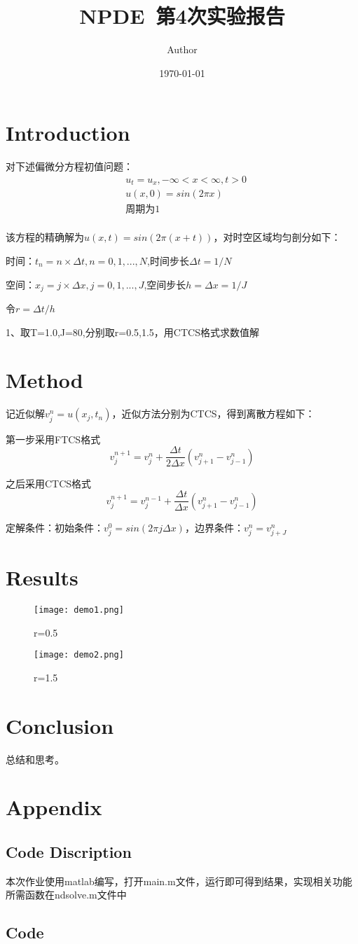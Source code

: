 \documentclass{article}
\title{NPDE~第4次实验报告}
\author{Author}
\date{\today}
\begin{document}
\maketitle

\section{Introduction}

对下述偏微分方程初值问题：
$$
\begin{aligned}
    &u_t=u_x,-\infty<x<\infty,t>0\\
    &u(x,0)=sin(2\pi x)\\
    &\text{周期为1}\\
\end{aligned}
$$

该方程的精确解为$u(x,t)=sin(2\pi(x+t))$，对时空区域均匀剖分如下：

时间：$t_n=n\times \Delta t,n=0,1,...,N$,时间步长$\Delta t=1/N$

空间：$x_j=j\times \Delta x,j=0,1,...,J$,空间步长$h=\Delta x=1/J$

令$r=\Delta t/h$

1、取T=1.0,J=80,分别取r=0.5,1.5，用CTCS格式求数值解
\section{Method}

记近似解$v_j^n=u(x_j,t_n)$，近似方法分别为CTCS，得到离散方程如下：

第一步采用FTCS格式
$$v_j^{n+1}=v_j^n+\frac{\Delta t}{2\Delta x}(v_{j+1}^n-v_{j-1}^n)$$

之后采用CTCS格式
$$v_j^{n+1}=v_j^{n-1}+\frac{\Delta t}{\Delta x}(v_{j+1}^n-v_{j-1}^n)$$

定解条件：初始条件：$v_j^0=sin(2\pi j\Delta x)$，边界条件：$v_j^n=v_{j+J}^n$


\section{Results}

\begin{figure}[H]
    \centering
    \texttt{[image: demo1.png]}
    \caption{r=0.5}\label{fig:demo1}
\end{figure}

\begin{figure}[H]
    \centering
    \texttt{[image: demo2.png]}
    \caption{r=1.5}\label{fig:demo2}
\end{figure}

\section{Conclusion}

总结和思考。

\section{Appendix}
\subsection{Code Discription}
本次作业使用matlab编写，打开main.m文件，运行即可得到结果，实现相关功能所需函数在ndsolve.m文件中
\subsection{Code}


\end{document}
